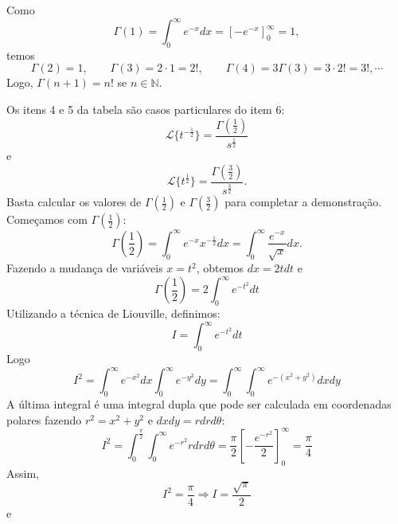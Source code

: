 Como 
\begin{equation}
\Gamma(1)=\int_0^\infty e^{-x}dx=\left[-e^{-x}\right]_0^\infty=1,
\end{equation}
temos
\begin{equation}
\Gamma(2)=1,\qquad \Gamma(3)=2\cdot 1=2!,\qquad \Gamma(4)=3\Gamma(3)=3\cdot 2!=3!,\cdots
\end{equation}
Logo, $\Gamma(n+1)=n!$ se $n\in\mathbb{N}$.
\begin{ex} Os itens 4 e 5 da tabela são casos particulares do item 6:
 \begin{equation}
 \mathcal{L}\{t^{-\frac{1}{2}}\}=\frac{\Gamma\left(\frac{1}{2}\right)}{s^{\frac{1}{2}}}
 \end{equation}
e
 \begin{equation}
 \mathcal{L}\{t^{\frac{1}{2}}\}=\frac{\Gamma\left(\frac{3}{2}\right)}{s^{\frac{3}{2}}}.
 \end{equation}
 Basta calcular os valores de $\Gamma\left(\frac{1}{2}\right)$ e $\Gamma\left(\frac{3}{2}\right)$ para completar a demonstração. Começamos com $\Gamma\left(\frac{1}{2}\right)$:
 \begin{equation}
 \Gamma\left(\frac{1}{2}\right)=\int_0^\infty e^{-x}x^{-\frac{1}{2}}dx=\int_0^\infty \frac{e^{-x}}{\sqrt{x}}dx.
 \end{equation}
 Fazendo a mudança de variáveis $x=t^{2}$, obtemos $dx=2tdt$ e
\begin{equation}\Gamma\left(\frac{1}{2}\right)=2\int_{0}^{\infty}e^{-t^2}dt
\end{equation}
Utilizando a técnica de Liouville, definimos:
\begin{equation}
I=\int_{0}^{\infty}e^{-t^2}dt
\end{equation}
Logo
\begin{equation}
I^2=\int_{0}^{\infty}e^{-x^2}dx\int_{0}^{\infty}e^{-y^2}dy=\int_{0}^{\infty}\int_{0}^{\infty}e^{-(x^2+y^2)}dx dy
\end{equation}
A última integral é uma integral dupla que pode ser calculada em coordenadas polares fazendo $r^2=x^2+y^2$ e $dxdy=rdrd\theta$:
\begin{equation}
I^2=\int_{0}^{\frac{\pi}{2}}\int_{0}^{\infty}e^{-r^2}rdr d{\theta}=\frac{\pi}{2}\left[-\frac{e^{-r^2}}{2}\right]_0^\infty=\frac{\pi}{4}
\end{equation}
Assim,
\begin{equation}
I^2=\frac{\pi}{4}\Rightarrow I=\frac{\sqrt{\pi}}{2}
\end{equation}
e
\begin{equation}

\end{equation}
\end{ex}
